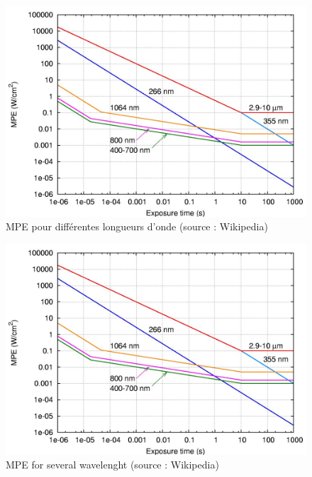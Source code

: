 \begin{appendices}
\begin{fr}
\begin{figure}
        \includegraphics[width=\textwidth]{images/IEC60825_MPE_W_s.jpg}
                \caption{MPE pour différentes longueurs d'onde (source : Wikipedia)}
        \label{fig:mpe-watt}
\end{figure}
\end{fr}
        
\begin{en}
        \begin{figure}
        \includegraphics[width=\textwidth]{images/IEC60825_MPE_W_s.jpg}
                \caption{MPE for several wavelenght (source : Wikipedia)}
        \label{fig:mpe-watt}
        \end{figure}
\end{en}



\end{appendices}
